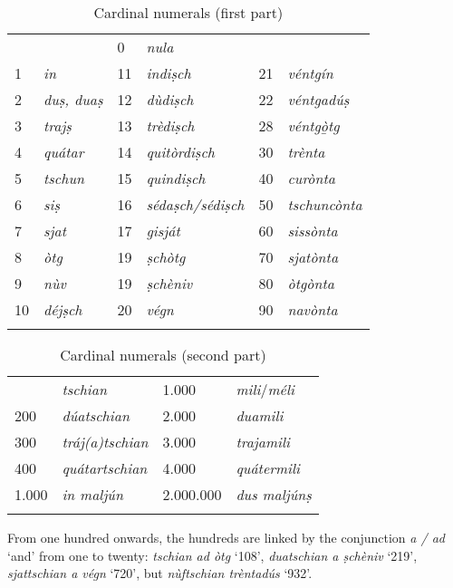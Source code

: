 \begin{table}
\caption{Cardinal numerals (first part)} 
\label{tab:cardnum1}
 \begin{tabular}{llllll}
  \lsptoprule
 &&0&\textit{nula}\\
1&\textit{in}&11&\textit{indiṣch}&21&\textit{véntgín}\\
2&\textit{duṣ, duaṣ}&12&\textit{dùdiṣch}&22&\textit{véntgadúṣ}\\
3&\textit{trajṣ}&13&\textit{trèdiṣch}&28&\textit{véntgò̱tg}\\
4&\textit{quátar}&14&\textit{quitòrdiṣch}&30 & \textit{trènta}\\
5&\textit{tschun}&15&\textit{quindiṣch} & 40 & \textit{curònta}\\
6&\textit{siṣ}&16&\textit{sédaṣch/sédiṣch}& 50 & \textit{tschuncònta}\\
7&\textit{sjat}&17&\textit{gisját} & 60 & \textit{sissònta}\\
8&\textit{òtg}&19& \textit{ṣchòtg} & 70 & \textit{sjatònta}\\
9&\textit{nùv}&19& \textit{ṣchèniv} & 80 & \textit{òtgònta}\\
10&\textit{déjṣch}&20&\textit{végn} & 90 & \textit{navònta}\\
  \lspbottomrule
 \end{tabular}
\end{table}

\begin{table}
	\caption{Cardinal numerals (second part)} 
	\label{tab:cardnum2}
	\begin{tabular}{llll}
		\lsptoprule
		100&\textit{tschian} & 1.000 & \textit{mili}/\textit{méli}\\
		200&\textit{dúatschian} & 2.000 & \textit{duamili}\\
		300&\textit{tráj(a)tschian} & 3.000 & \textit{trajamili}\\
		400&\textit{quátartschian} & 4.000 &  \textit{quátermili}\\
		1.000 & \textit{in maljún} & 2.000.000 & \textit{dus maljúnṣ}\\
		\lspbottomrule
	\end{tabular}
\end{table}

From one hundred onwards, the hundreds are linked by the conjunction \textit{a / ad} `and' from one to twenty: \textit{tschian ad òtg} `108', \textit{duatschian a ṣchèniv} `219', \textit{sjattschian a végn} `720', but \textit{nùftschian trèntadús} `932'.

